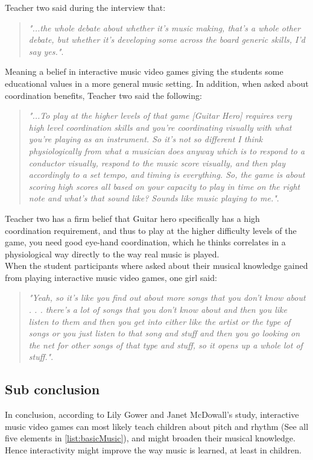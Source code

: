 	Teacher two said during the interview that:
	\begin{quote}
		\textit{"...the whole debate about whether it’s music making, that’s a whole other debate, but whether it’s developing some across the board generic skills, I’d say yes."}\cite[p.~98]{interactiveMusicVideoGames}.\\
	\end{quote}
	Meaning a belief in interactive music video games giving the students some educational values in a more general music setting. In addition, when asked about coordination benefits, Teacher two said the following:
	\begin{quote}
		\textit{"...To play at the higher levels of that game [Guitar Hero] requires very high level coordination skills and you’re coordinating visually with what you’re playing as an instrument. So it’s not so different I think physiologically from what a musician does anyway which is to respond to a conductor visually, respond to the music score visually, and then play accordingly to a set tempo, and timing is everything. So, the game is about scoring high scores all based on your capacity to play in time on the right note and what’s that sound like? Sounds like music playing to me."}\cite[p.~98]{interactiveMusicVideoGames}.\\
	\end{quote}
	Teacher two has a firm belief that Guitar hero specifically has a high coordination requirement, and thus to play at the higher difficulty levels of the game, you need good eye-hand coordination, which he thinks correlates in a physiological way directly to the way real music is played.\\
	
	When the student participants where asked about their musical knowledge gained from playing interactive music video games, one girl said:
	\begin{quote}
		\textit{"Yeah, so it’s like you find out about more songs that you don’t know about . . . there’s a lot of songs that you don’t know about and then you like listen to them and then you get into either like the artist or the type of songs or you just listen to that song and stuff and then you go looking on the net for other songs of that type and stuff, so it opens up a whole lot of stuff."}\cite[p.~100]{interactiveMusicVideoGames}.\\
	\end{quote}
	\subsection*{Sub conclusion}
		In conclusion, according to Lily Gower and Janet McDowall's study\cite{interactiveMusicVideoGames}, interactive music video games can most likely teach children about pitch and rhythm (See all five elements in \autoref{list:basicMusic}), and might broaden their musical knowledge. Hence interactivity might improve the way music is learned, at least in children.

